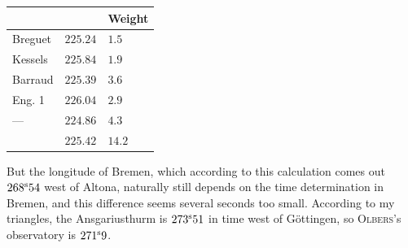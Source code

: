 \begin{center}
\begin{tabular}{l|l|l}
 & & Weight \\
\hline
Breguet & $225.24$ & $1.5$ \\
Kessels & $225.84$ & $1.9$ \\
Barraud & $225.39$ & $3.6$ \\
Eng. 1 & $226.04$ & $2.9$ \\
---\quad 4 & $224.86$ & $4.3$ \\
\hline
 & $225.42$ & $14.2$ \\
\end{tabular}
\end{center}

But the longitude of Bremen, which according to this calculation comes out $268^{\rm s}54$ west of Altona, naturally still depends on the time determination in Bremen, and this difference seems several seconds too small. According to my triangles, the Ansgariusthurm is $273^{\rm s}51$ in time west of Göttingen, so \textsc{Olbers}’s observatory is $271^{\rm s}9$.
